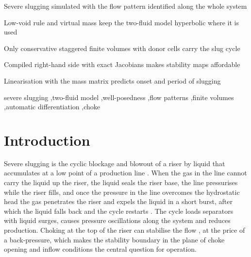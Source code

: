 \documentclass[a4paper,fleqn]{cas-sc}
\begin{document}
\begin{abstract}
surge. A gas-lift branch --- line, annulus and check valve, simulated with the same model and controlled only by the gas pressure at the platform --- shortens and regularises the cycle between 100 and \SI{120}{\bar}, with the injection modulated by the cycle, and suppresses it from \SI{130}{\bar}, at an injected rate of \SI{0.9}{\kilogram\per\second}, seven times the free gas of the well, with \SI{29}{\percent} more production.
\end{abstract}

\begin{highlights}
\item Severe slugging simulated with the flow pattern identified along the whole system
\item Low-void rule and virtual mass keep the two-fluid model hyperbolic where it is used
\item Only conservative staggered finite volumes with donor cells carry the slug cycle
\item Compiled right-hand side with exact Jacobians makes stability maps affordable
\item Linearisation with the mass matrix predicts onset and period of slugging
\end{highlights}

\begin{keywords}
severe slugging \sep two-fluid model \sep well-posedness \sep flow patterns \sep finite volumes \sep automatic differentiation \sep choke
\end{keywords}

\maketitle

\section{Introduction}\label{sec:intro}

Severe slugging is the cyclic blockage and blowout of a riser by liquid that accumulates at a low point of a production line \citep{schmidt1980,boe1981,pots1987}. When the gas in the line cannot carry the liquid up the riser, the liquid seals the riser base, the line pressurises while the riser fills, and once the pressure in the line overcomes the hydrostatic head the gas penetrates the riser and expels the liquid in a short burst, after which the liquid falls back and the cycle restarts \citep{taitel1986,fabre1990,taitel1990a}. The cycle loads separators with liquid surges, causes pressure oscillations along the system and reduces production. Choking at the top of the riser can stabilise the flow \citep{schmidt1979,jansen1996}, at the price of a back-pressure, which makes the stability boundary in the plane of choke opening and inflow conditions the central question for operation.
\end{document}
